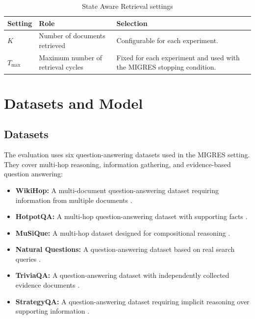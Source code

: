 \documentclass[12pt,a4paper]{report}
\begin{document}
\begin{table}[H]
\centering
\caption{State Aware Retrieval settings}
\label{tab:sar-settings}
\renewcommand{\arraystretch}{1.2}
\begin{tabular}{|p{1.45in}|p{1.75in}|p{2.9in}|}
\hline
\textbf{Setting} & \textbf{Role} & \textbf{Selection} \\ \hline
$K$ & Number of documents retrieved & Configurable for each experiment. \\ \hline
$T_{\max}$ & Maximum number of retrieval cycles & Fixed for each experiment and used with the MIGRES stopping condition. \\ \hline
\end{tabular}
\end{table}
\clearpage
\section{Datasets and Model}

\subsection{Datasets}

The evaluation uses six question-answering datasets used in the MIGRES setting. They cover multi-hop reasoning, information gathering, and evidence-based question answering:

\begin{itemize}
    \item \textbf{WikiHop:} A multi-document question-answering dataset requiring information from multiple documents \cite{welbl2018wikihop}.
    \item \textbf{HotpotQA:} A multi-hop question-answering dataset with supporting facts \cite{yang2018hotpotqa}.
    \item \textbf{MuSiQue:} A multi-hop dataset designed for compositional reasoning \cite{trivedi2022musique}.
    \item \textbf{Natural Questions:} A question-answering dataset based on real search queries \cite{kwiatkowski2019natural}.
    \item \textbf{TriviaQA:} A question-answering dataset with independently collected evidence documents \cite{joshi2017triviaqa}.
    \item \textbf{StrategyQA:} A question-answering dataset requiring implicit reasoning over supporting information \cite{geva2021strategyqa}.
\end{itemize}
\end{document}
